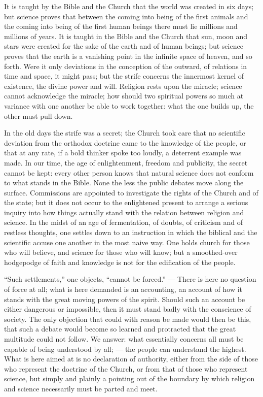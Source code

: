 \documentclass[12pt,a4paper,openany]{book}
\newcommand{\opage}[1]{\marginnote{\footnotesize\textit{[#1]}}}
\begin{document}
It is taught by the Bible and the Church that the world was created in
six days; but science proves that between
the coming into being of the first animals and the coming into being of the
first human beings there must lie millions and millions of years.
\setcounter{footnote}{0}%
\opage{61}It is taught in the Bible and the Church that sun, moon and stars
were created for the sake of the earth and of human beings; but
science proves that the earth is a vanishing
point in the infinite space of heaven, and so forth. Were
it only deviations in the conception of the outward,
of relations in time and space, it might pass; but the strife
concerns the innermost kernel of existence, the divine
power and will. Religion rests upon the miracle;
science cannot acknowledge the miracle; how
should two spiritual powers so much at variance with one another
be able to work together: what the one builds up, the
other must pull down.

In the old days the strife was a secret; the Church
took care that no scientific deviation from the
orthodox doctrine came to the knowledge of the people, or that
at any rate, if a bold thinker spoke too loudly,
a deterrent example was made. %
In our time, the age of enlightenment,
freedom and publicity, the secret
cannot be kept: every other person knows
that natural science does not conform to what stands in
the Bible. None the less the public debates move
along the surface. Commissions are appointed
to investigate the rights of the Church and of the state;
but it does not occur to the enlightened present to arrange
a serious inquiry into how things actually
stand with the relation between religion and science.
In the midst of an age of fermentation, of doubts, of criticism
and of restless thoughts, one settles down to
an instruction in which the biblical and the scientific
accuse one another in the most naive way.
One holds church for those who will believe, and
science for those who will know; but a smoothed-over
\setcounter{footnote}{0}%
\opage{62}hodgepodge of faith and knowledge is not for the edification
of the people.

``Such settlements,'' one objects, ``cannot be
forced.'' --- There is here no question of force at all; what
is here demanded is an accounting, an account of how
it stands with the great moving powers of the spirit.
Should such an account be either dangerous or
impossible, then it must stand badly with the conscience of
society. The only objection that could with reason
be made would then be this, that such a debate
would become so learned and protracted that the
great multitude could not follow. We answer:
what essentially concerns all must be capable of being understood
by all; --- the people can understand the highest.
What is here aimed at is no declaration of authority,
either from the side of those who represent the doctrine of the Church, or
from that of those who represent science, but simply
and plainly a pointing out of the boundary by which religion
and science necessarily must be parted and meet.
\end{document}
